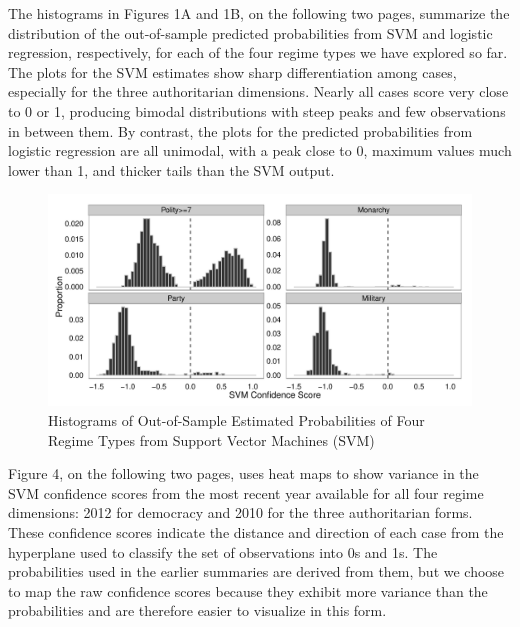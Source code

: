 \documentclass[pdftex,12pt,fullpage,oneside]{amsart}
\begin{document}
The histograms in Figures 1A and 1B, on the following two pages, summarize the distribution of the out-of-sample predicted probabilities from SVM and logistic regression, respectively, for each of the four regime types we have explored so far.  The plots for the SVM estimates show sharp differentiation among cases, especially for the three authoritarian dimensions. Nearly all cases score very close to 0 or 1, producing bimodal distributions with steep peaks and few observations in between them. By contrast, the plots for the predicted probabilities from logistic regression are all unimodal, with a peak close to 0, maximum values much lower than 1, and thicker tails than the SVM output. 

\begin{figure}[ht]
	\centering
	\includegraphics[width=.7\textwidth]{pol_bin_probDist}
	\caption{Histograms of Out-of-Sample Estimated Probabilities of Four Regime Types from Support Vector Machines (SVM)}
\end{figure}

Figure 4, on the following two pages, uses heat maps to show variance in the SVM confidence scores from the most recent year available for all four regime dimensions: 2012 for democracy and 2010 for the three authoritarian forms. These confidence scores indicate the distance and direction of each case from the hyperplane used to classify the set of observations into 0s and 1s. The probabilities used in the earlier summaries are derived from them, but we choose to map the raw confidence scores because they exhibit more variance than the probabilities and are therefore easier to visualize in this form.
\end{document}
